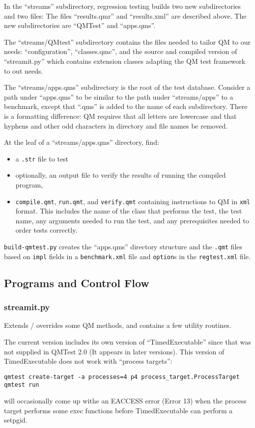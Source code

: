 \documentclass[11pt]{article}
\begin{document}
In the ``streams'' subdirectory, regression testing builds two new
subdirectories and two files:  The files ``results.qmr'' and
``results.xml'' are described above.
The new subdirectories are ``QMTest'' and ``apps.qms''.

The ``streams/QMtest'' subdirectory contains the files needed to
tailor QM to our needs:  ``configuration'', ``classes.qmc'', and the
source and compiled version of ``streamit.py'' which contains extension
classes adapting the QM test framework to out needs.

The ``streams/apps.qms'' subdirectory is the root of the test
database.  Consider a path under ``apps.qms'' to be similar to the
path under ``streams/apps'' to a benchmark, except that ``.qms'' is
added to the name of each subdirectory.  There is a formatting
difference: QM requires that all letters are lowercase and that
hyphens and other odd characters in directory and file names be
removed.

At the leaf of a  ``streams/apps.qms'' directory, find: 
\begin{itemize}
\item a {\tt .str} file to test
\item optionally, an output file to verify the results of running the 
compiled program,
\item {\tt compile.qmt}, {\tt run.qmt}, and {\tt verify.qmt}
containing instructions to QM in {\tt xml} format.
This includes the name of the class that performs the test, the test
name, any arguments needed to run the test, and any prerequisites
needed to order tests correctly.
\end{itemize}
{\tt build-qmtest.py} creates the ``apps.qms'' directory structure and
the {\tt .qmt} files based on {\tt impl} fields in a {\tt benchmark.xml}
file and {\tt option}s in the {\tt regtest.xml} file.

\subsection{Programs and Control Flow}

\subsubsection{streamit.py}
Extends / overrides some QM methods, and contains a few utility routines.

The current version includes its own version of ``TimedExecutable''
since that was not supplied in QMTest 2.0 (It appears in later
versions).  This version of TimedExecutable does not work with
``process targets'':
\begin{verbatim}
qmtest create-target -a processes=4 p4 process_target.ProcessTarget
qmtest run
\end{verbatim}
will occasionally come up withe an EACCESS error (Error 13) when the
process target performs some exec functions before TimedExecutable can
perform a setpgid.
\end{document}
